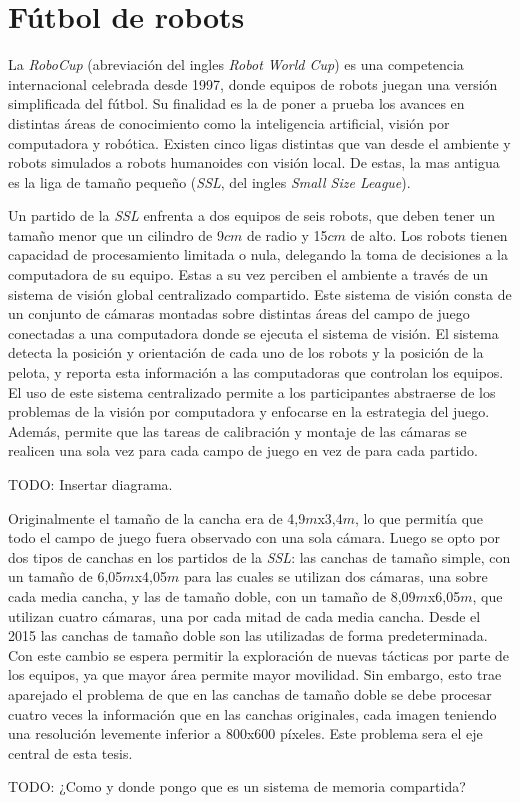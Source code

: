 
\section{Fútbol de robots}

La \emph{RoboCup} (abreviación del ingles \emph{Robot World Cup}) es una
competencia internacional celebrada desde 1997, donde equipos de robots juegan
una versión simplificada del fútbol. Su finalidad es la de poner a prueba los
avances en distintas áreas de conocimiento como la inteligencia artificial,
visión por computadora y robótica. Existen cinco ligas distintas que van desde
el ambiente y robots simulados a robots humanoides con visión local. De estas,
la mas antigua es la liga de tamaño pequeño (\emph{SSL}, del ingles \emph{Small
Size League}).

Un partido de la \emph{SSL} enfrenta a dos equipos de seis robots, que deben
tener un tamaño menor que un cilindro de 9$cm$ de radio y 15$cm$ de
alto\cite{sslrules2015}. Los robots tienen capacidad de procesamiento limitada o
nula, delegando la toma de decisiones a la computadora de su equipo. Estas a su
vez perciben el ambiente a través de un sistema de visión global centralizado
compartido. Este sistema de visión consta de un conjunto de cámaras montadas
sobre distintas áreas del campo de juego conectadas a una computadora donde se
ejecuta el sistema de visión. El sistema detecta la posición y orientación de
cada uno de los robots y la posición de la pelota, y reporta esta información a
las computadoras que controlan los equipos. El uso de este sistema centralizado
permite a los participantes abstraerse de los problemas de la visión por
computadora y enfocarse en la estrategia del juego. Además, permite que las
tareas de calibración y montaje de las cámaras se realicen una sola vez para
cada campo de juego en vez de para cada partido.


TODO: Insertar diagrama.

Originalmente el tamaño de la cancha era de 4,9$m$x3,4$m$, lo que permitía que
todo el campo de juego fuera observado con una sola cámara. Luego se opto por
dos tipos de canchas en los partidos de la \emph{SSL}: las canchas de tamaño
simple, con un tamaño de 6,05$m$x4,05$m$ para las cuales se utilizan dos
cámaras, una sobre cada media cancha, y las de tamaño doble, con un tamaño de
8,09$m$x6,05$m$, que utilizan cuatro cámaras, una por cada mitad de cada media
cancha. Desde el 2015 las canchas de tamaño doble son las utilizadas de forma
predeterminada\cite{sslrules2015}. Con este cambio se espera permitir la
exploración de nuevas tácticas por parte de los equipos, ya que mayor área
permite mayor movilidad. Sin embargo, esto trae aparejado el problema de que en
las canchas de tamaño doble se debe procesar cuatro veces la información que en
las canchas originales, cada imagen teniendo una resolución levemente inferior a
800x600 píxeles. Este problema sera el eje central de esta tesis.

TODO: ¿Como y donde pongo que es un sistema de memoria compartida?

